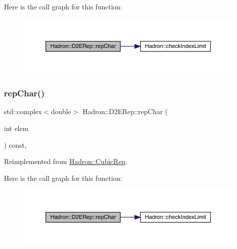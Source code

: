 Here is the call graph for this function\+:
\nopagebreak
\begin{figure}[H]
\begin{center}
\leavevmode
\includegraphics[width=350pt]{d4/d82/structHadron_1_1D2ERep_a0507e2c08a6c305e5f0fc4f36a92f0be_cgraph}
\end{center}
\end{figure}
\mbox{\label{structHadron_1_1D2ERep_a0507e2c08a6c305e5f0fc4f36a92f0be}} 
\subsubsection{\texorpdfstring{repChar()}{repChar()}\hspace{0.1cm}{\footnotesize\ttfamily [2/2]}}
{\footnotesize\ttfamily std\+::complex$<$double$>$ Hadron\+::\+D2\+E\+Rep\+::rep\+Char (\begin{DoxyParamCaption}\item[{int}]{elem }\end{DoxyParamCaption}) const\hspace{0.3cm}{\ttfamily [inline]}, {\ttfamily [virtual]}}



Reimplemented from \mbox{\hyperlink{structHadron_1_1CubicRep_af45227106e8e715e84b0af69cd3b36f8}{Hadron\+::\+Cubic\+Rep}}.

Here is the call graph for this function\+:
\nopagebreak
\begin{figure}[H]
\begin{center}
\leavevmode
\includegraphics[width=350pt]{d4/d82/structHadron_1_1D2ERep_a0507e2c08a6c305e5f0fc4f36a92f0be_cgraph}
\end{center}
\end{figure}
\mbox{\label{structHadron_1_1D2ERep_a0d6937e2a9cf2e22df238b7e3eafbf8e}} 
